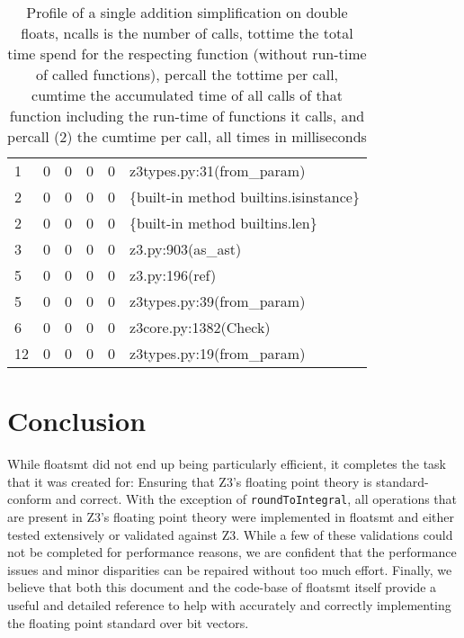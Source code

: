 \documentclass[a4paper,UKenglish,cleveref, autoref, thm-restate]{lipics-v2019}
\begin{document}
\begin{table}[]
\begin{tabular}{lllll|l}
		1      & 0       & 0       & 0       & 0       & z3types.py:31(from\_param)                          \\
		2      & 0       & 0       & 0       & 0       & \{built-in method builtins.isinstance\}             \\
		2      & 0       & 0       & 0       & 0       & \{built-in method builtins.len\}                    \\
		3      & 0       & 0       & 0       & 0       & z3.py:903(as\_ast)                                  \\
		5      & 0       & 0       & 0       & 0       & z3.py:196(ref)                                      \\
		5      & 0       & 0       & 0       & 0       & z3types.py:39(from\_param)                          \\
		6      & 0       & 0       & 0       & 0       & z3core.py:1382(Check)                               \\
		12     & 0       & 0       & 0       & 0       & z3types.py:19(from\_param)                         
	\end{tabular}
	\caption{Profile of a single addition simplification on double floats, ncalls is the number of calls, tottime the total time spend for the respecting function (without run-time of called functions), percall the tottime per call, cumtime the accumulated time of all calls of that function including the run-time of functions it calls, and percall (2) the cumtime per call, all times in milliseconds}
	\label{tab:singleadditionsimplify}
\end{table}



\section{Conclusion}
While floatsmt did not end up being particularly efficient, it completes the task that it was created for: Ensuring that Z3's floating point theory is standard-conform and correct. With the exception of \verb|roundToIntegral|, all operations that are present in Z3's floating point theory were implemented in floatsmt and either tested extensively or validated against Z3. While a few of these validations could not be completed for performance reasons, we are confident that the performance issues and minor disparities can be repaired without too much effort. Finally, we believe that both this document and the code-base of floatsmt itself provide a useful and detailed reference to help with accurately and correctly implementing the floating point standard over bit vectors.



\appendix
\end{document}
